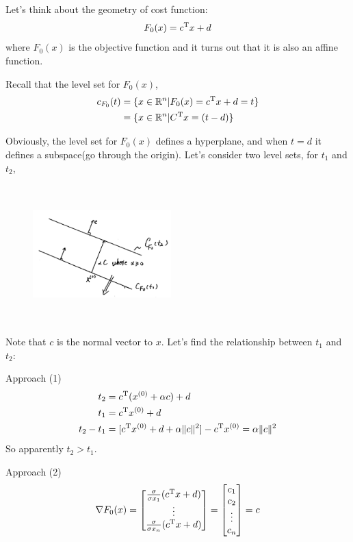 Let's think about the geometry of cost function:
$$
F_0(x) =c^{{\rm T}}x + d
$$
where $F_0(x)$ is the objective function and it turns out that it is also an affine function.

Recall that the level set for $F_0(x)$, 
\begin{align*}
	c_{F_0}(t) &=\{ x\in \mathbb{R}^n | F_0(x) = c^{{\rm T}}x + d = t \}\\
	&= \{x\in \mathbb{R}^n | C^{{\rm T}}x = (t-d) \}
\end{align*}

Obviously, the level set for $F_0(x)$ defines a hyperplane, and when $t=d$ it defines a subspace(go through the origin). Let's consider two level sets, for $t_1$ and $t_2$,

\begin{figure}
	\centering
	\includegraphics[width=2.1in,height=2.1in]{figures/ch07/figure1012_1.png}
\end{figure}

Note that $c$ is the normal vector to $x$. Let's find the relationship between $t_1$ and $t_2$:

Approach (1)
\begin{align*}
	t_2 &= c^{{\rm T}}(x^{(0)}+\alpha c) + d\\
	t_1 &= c^{{\rm T}}x^{(0)} + d\\
	t_2 - t_1 &= [c^{{\rm T}}x^{(0)} + d + \alpha \Vert c\Vert ^2] - c^{{\rm T}}x^{(0)} = \alpha \Vert c \Vert^2
\end{align*}
So apparently $t_2>t_1$.

Approach (2)
\begin{equation*}
	\nabla F_0(x) =
	\begin{bmatrix}
		\frac{\sigma}{\sigma x_1}(c^{{\rm T}}x+d)\\
		\vdots\\
		\frac{\sigma}{\sigma x_n}(c^{{\rm T}}x+d)
	\end{bmatrix} = 
	\begin{bmatrix}
		c_1\\
		c_2\\
		\vdots\\
		c_n
	\end{bmatrix} = c
\end{equation*}

